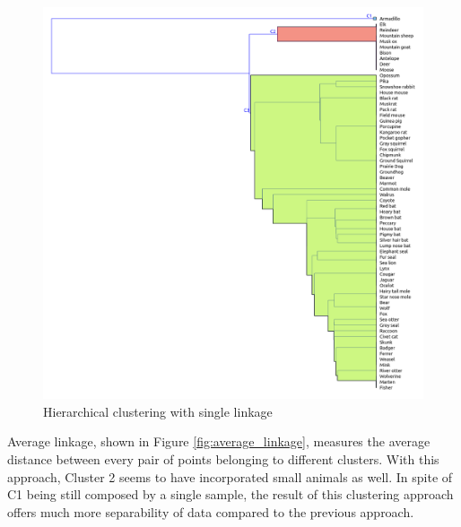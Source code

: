 \documentclass{article}
\begin{document}
\begin{figure}[htbp]
    \centering
    \includegraphics[scale=0.2]{single.png}
    \caption{Hierarchical clustering with single linkage}
    \label{fig:single_linkage}
\end{figure}

Average linkage, shown in Figure \ref{fig:average_linkage}, measures the average distance between every pair of points belonging to different clusters. With this approach, Cluster 2 seems to have incorporated small animals as well. In spite of C1 being still composed by a single sample, the result of this clustering approach offers much more separability of data compared to the previous approach.
\end{document}
